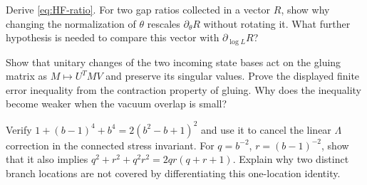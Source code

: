 \begin{exercise}\label{ex:overlap-response}
Derive \eqref{eq:HF-ratio}. For two gap ratios collected in a vector
$R$, show why changing the normalization of $\theta$ rescales
$\partial_\theta R$ without rotating it. What further hypothesis is
needed to compare this vector with $\partial_{\log L}R$?

\par\smallskip{}\par
\end{exercise}
\begin{exercise}\label{ex:overlap-current}
Show that unitary changes of the two incoming state bases act on
the gluing matrix as $M\mapsto U^TMV$ and preserve its singular
values. Prove the displayed finite error inequality from the
contraction property of gluing. Why does the inequality become
weaker when the vacuum overlap is small?

\par\smallskip{}\par
\end{exercise}
\begin{exercise}\label{ex:overlap-branch}
Verify $1+(b-1)^4+b^4=2(b^2-b+1)^2$ and use it to cancel
the linear $\Lambda$ correction in the connected stress invariant.
For $q=b^{-2}$, $r=(b-1)^{-2}$, show that it also implies
$q^2+r^2+q^2r^2=2qr(q+r+1)$. Explain why two distinct branch
locations are not covered by differentiating this one-location
identity.

\par\smallskip{}\par
\end{exercise}
